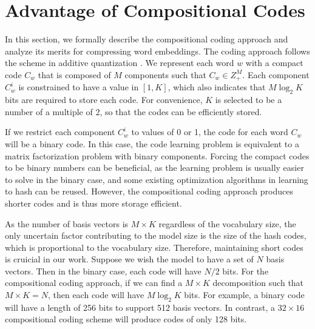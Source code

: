 \documentclass{article} %
\begin{document}
\section{Advantage of Compositional Codes}

In this section, we formally describe the compositional coding approach and analyze its merits for compressing word embeddings. The coding approach follows the scheme in additive quantization \citep{Babenko2014AdditiveQF}. We represent each word $w$ with a compact code $C_w$ that is composed of $M$ components such that $C_w \in Z^M_+$. Each component $C_w^i$ is constrained to have a value in $[1, K]$, which also indicates that $M\log_2 K$ bits are required to store each code. For convenience, $K$ is selected to be a number of a multiple of $2$, so that the codes can be efficiently stored. 


If we restrict each component $C_w^i$ to values of 0 or 1, the code for each word $C_w$ will be a binary code. In this case, the code learning problem is equivalent to a matrix factorization problem with binary components. Forcing the compact codes to be binary numbers can be beneficial, as the learning problem is usually easier to solve in the binary case, and some existing optimization algorithms in learning to hash can be reused. However, the compositional coding approach produces shorter codes and is thus more storage efficient. 

As the number of basis vectors is $M \times K$ regardless of the vocabulary size, the only uncertain factor contributing to the model size is the size of the hash codes, which is proportional to the vocabulary size. Therefore, maintaining short codes is cruicial in our work. Suppose we wish the model to have a set of $N$ basis vectors. Then in the binary case, each code will have $N / 2$ bits. For the compositional coding approach, if we can find a $M \times K$ decomposition such that $M \times K = N$, then each code will have $M \log_2 K$ bits. For example, a binary code will have a length of 256 bits to support 512 basis vectors. In contrast, a $32 \times 16$ compositional coding scheme will produce codes of only 128 bits.

\end{document}
